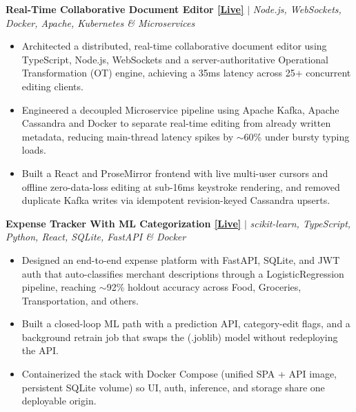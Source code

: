 \documentclass[letterpaper,8pt]{extarticle}
\newcommand{\ulink}[2]{\href{#1}{\underline{#2}}}
\newcommand{\live}[1]{\ulink{#1}{[Live]}}
\newcommand{\projectHeading}[2]{%
  \vspace{2.4pt}%
  {\raggedright\textbf{#1} $|$ \textit{#2}\par}%
  \vspace{1.4pt}%
}
\begin{document}
\projectHeading
  {Real-Time Collaborative Document Editor \live{https://adclintoncodes.github.io/Real-Time-Collaborative-Editor/}}
  {Node.js, WebSockets, Docker, Apache, Kubernetes \& Microservices}
\begin{itemize}
  \item Architected a distributed, real-time collaborative document editor using TypeScript, Node.js, WebSockets and a server-authoritative Operational Transformation (OT) engine, achieving a 35ms latency across 25+ concurrent editing clients.
  \item Engineered a decoupled Microservice pipeline using Apache Kafka, Apache Cassandra and Docker to separate real-time editing from already written metadata, reducing main-thread latency spikes by $\sim$60\% under bursty typing loads.
  \item Built a React and ProseMirror frontend with live multi-user cursors and offline zero-data-loss editing at sub-16ms keystroke rendering, and removed duplicate Kafka writes via idempotent revision-keyed Cassandra upserts.
\end{itemize}

\projectHeading
  {Expense Tracker With ML Categorization \live{https://github.com/adclintoncodes/Expense-Tracker-with-ML-Categorization}}
  {scikit-learn, TypeScript, Python, React, SQLite, FastAPI \& Docker}
\begin{itemize}
  \item Designed an end-to-end expense platform with FastAPI, SQLite, and JWT auth that auto-classifies merchant descriptions through a LogisticRegression pipeline, reaching $\sim$92\% holdout accuracy across Food, Groceries, Transportation, and others.
  \item Built a closed-loop ML path with a prediction API, category-edit flags, and a background retrain job that swaps the (.joblib) model without redeploying the API.
  \item Containerized the stack with Docker Compose (unified SPA + API image, persistent SQLite volume) so UI, auth, inference, and storage share one deployable origin.
\end{itemize}
\end{document}
